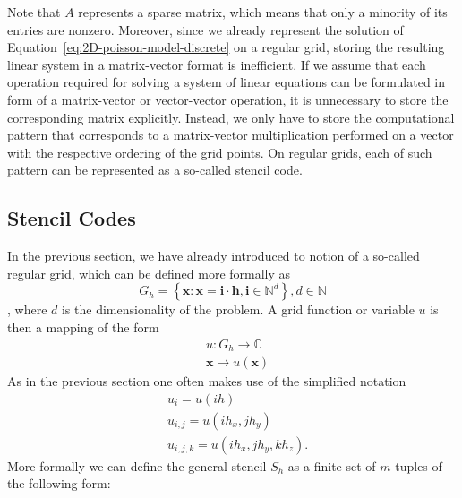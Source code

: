 Note that $A$ represents a sparse matrix, which means that only a minority of its entries are nonzero.
Moreover, since we already represent the solution of Equation~\ref{eq:2D-poisson-model-discrete} on a regular grid, storing the resulting linear system in a matrix-vector format is inefficient.
If we assume that each operation required for solving a system of linear equations can be formulated in form of a matrix-vector or vector-vector operation, it is unnecessary to store the corresponding matrix explicitly.
Instead, we only have to store the computational pattern that corresponds to a matrix-vector multiplication performed on a vector with the respective ordering of the grid points.
On regular grids, each of such pattern can be represented as a so-called stencil code.
\subsection{Stencil Codes}
\label{subsec:stencil-codes}
In the previous section, we have already introduced to notion of a so-called regular grid, which can be defined more formally as
\begin{equation}
	G_{h} = \left\{ \bm{x} : \bm{x} = \bm{i} \cdot \bm{h}, \bm{i} \in \mathbb{N}^d \right\}, d \in \mathbb{N}
\end{equation},
where $d$ is the dimensionality of the problem.
A grid function or variable $u$ is then a mapping of the form
\begin{equation}
	\begin{split}
		& u : G_{h}\to \mathbb{C} \\
		& \bm{x} \to u(\bm{x})
	\end{split}
\end{equation}
As in the previous section one often makes use of the simplified notation
\begin{equation}
	\begin{split}
		 & u_i = u(i h) \\
		& u_{i,j} = u(i h_x, j h_y) \\
		& u_{i,j,k} = u(i h_x, j h_y, k h_z).
	\end{split}
\end{equation}
More formally we can define the general stencil $S_h$ as a finite set of $m$ tuples of the following form:

